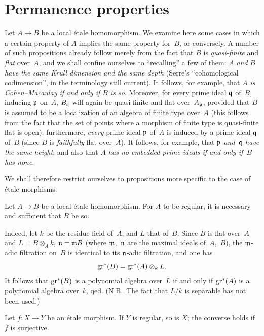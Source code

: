 \section{Permanence properties}
\label{I.9}

Let $A\to B$ be a local \'etale homomorphism. We examine here
some cases in which a certain property of $A$ implies the
same property for~$B$, or conversely.
A number of such propositions already follow merely from
the fact that $B$ is \emph{quasi-finite} and \emph{flat}
over~$A$, and we shall confine ourselves to ``recalling''
a few of them: $A$ \emph{and} $B$ \emph{have the same Krull
dimension and the same depth} (Serre's ``cohomological codimension'',
in the terminology still current). It follows, for example,
that \emph{$A$ is Cohen--Macaulay if and only if $B$ is so}.
Moreover, for every prime ideal $\mathfrak{q}$ of~$B$, inducing
$\mathfrak{p}$ on~$A$, $B_{\mathfrak{q}}$ will again be quasi-finite
and flat over~$A_{\mathfrak{p}}$, provided that $B$ is assumed
to be a localization of an algebra of finite type over~$A$
(this follows from the fact that the set of points where
a morphism of finite type is quasi-finite \resp flat is
open); furthermore, \emph{every} prime ideal $\mathfrak{p}$ of~$A$
is induced by a prime ideal $\mathfrak{q}$ of~$B$ (since $B$ is
\emph{faithfully} flat over~$A$). It follows, for example,
that \emph{$\mathfrak{p}$ and~$\mathfrak{q}$ have the same height};
and also that \emph{$A$ has no embedded prime ideals if
and only if~$B$ has none}.

We shall therefore restrict ourselves to propositions more
specific to the case of \'etale morphisms.

\begin{proposition}
\label{I.9.1}
Let $A\to B$ be a local \'etale homomorphism. For $A$ to be
regular, it is necessary and sufficient that $B$ be so.
\end{proposition}

Indeed, let $k$ be the residue field of~$A$, and $L$ that
of~$B$. Since $B$ is flat over~$A$ and $L=B\otimes_A k$,
\ie $\mathfrak{n}=\mathfrak{m}B$ (where $\mathfrak{m}$,~$\mathfrak{n}$
are the maximal ideals of~$A$,~$B$), the $\mathfrak{m}$-adic
filtration on~$B$ is identical to its $\mathfrak{n}$-adic
filtration, and one has
\[
\operatorname{gr}^*(B)=\operatorname{gr}^*(A)\otimes_k L.
\]
It follows that $\operatorname{gr}^*(B)$ is a polynomial algebra over~$L$
if and only if $\operatorname{gr}^*(A)$ is a polynomial algebra over~$k$,
qed. (N.B.\ The fact that $L/k$ is separable has not been used.)

\begin{corollary}
\label{I.9.2}
Let $f\colon X\to Y$ be an \'etale morphism. If $Y$ is
regular, so is $X$; the converse holds if $f$ is surjective.
\end{corollary}

